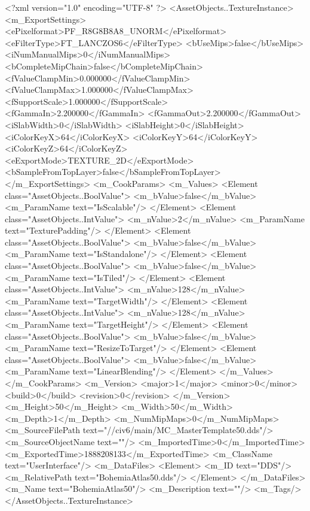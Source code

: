 <?xml version="1.0" encoding="UTF-8" ?>
<AssetObjects..TextureInstance>
	<m_ExportSettings>
		<ePixelformat>PF_R8G8B8A8_UNORM</ePixelformat>
		<eFilterType>FT_LANCZOS6</eFilterType>
		<bUseMips>false</bUseMips>
		<iNumManualMips>0</iNumManualMips>
		<bCompleteMipChain>false</bCompleteMipChain>
		<fValueClampMin>0.000000</fValueClampMin>
		<fValueClampMax>1.000000</fValueClampMax>
		<fSupportScale>1.000000</fSupportScale>
		<fGammaIn>2.200000</fGammaIn>
		<fGammaOut>2.200000</fGammaOut>
		<iSlabWidth>0</iSlabWidth>
		<iSlabHeight>0</iSlabHeight>
		<iColorKeyX>64</iColorKeyX>
		<iColorKeyY>64</iColorKeyY>
		<iColorKeyZ>64</iColorKeyZ>
		<eExportMode>TEXTURE_2D</eExportMode>
		<bSampleFromTopLayer>false</bSampleFromTopLayer>
	</m_ExportSettings>
	<m_CookParams>
		<m_Values>
			<Element class="AssetObjects..BoolValue">
				<m_bValue>false</m_bValue>
				<m_ParamName text="IsScalable"/>
			</Element>
			<Element class="AssetObjects..IntValue">
				<m_nValue>2</m_nValue>
				<m_ParamName text="TexturePadding"/>
			</Element>
			<Element class="AssetObjects..BoolValue">
				<m_bValue>false</m_bValue>
				<m_ParamName text="IsStandalone"/>
			</Element>
			<Element class="AssetObjects..BoolValue">
				<m_bValue>false</m_bValue>
				<m_ParamName text="IsTiled"/>
			</Element>
			<Element class="AssetObjects..IntValue">
				<m_nValue>128</m_nValue>
				<m_ParamName text="TargetWidth"/>
			</Element>
			<Element class="AssetObjects..IntValue">
				<m_nValue>128</m_nValue>
				<m_ParamName text="TargetHeight"/>
			</Element>
			<Element class="AssetObjects..BoolValue">
				<m_bValue>false</m_bValue>
				<m_ParamName text="ResizeToTarget"/>
			</Element>
			<Element class="AssetObjects..BoolValue">
				<m_bValue>false</m_bValue>
				<m_ParamName text="LinearBlending"/>
			</Element>
		</m_Values>
	</m_CookParams>
	<m_Version>
		<major>1</major>
		<minor>0</minor>
		<build>0</build>
		<revision>0</revision>
	</m_Version>
	<m_Height>50</m_Height>
	<m_Width>50</m_Width>
	<m_Depth>1</m_Depth>
	<m_NumMipMaps>0</m_NumMipMaps>
	<m_SourceFilePath text="//civ6/main/MC_MasterTemplate\Textures\BohemiaAtlas50.dds"/>
	<m_SourceObjectName text=""/>
	<m_ImportedTime>0</m_ImportedTime>
	<m_ExportedTime>1888208133</m_ExportedTime>
	<m_ClassName text="UserInterface"/>
	<m_DataFiles>
		<Element>
			<m_ID text="DDS"/>
			<m_RelativePath text="BohemiaAtlas50.dds"/>
		</Element>
	</m_DataFiles>
	<m_Name text="BohemiaAtlas50"/>
	<m_Description text=""/>
	<m_Tags/>
</AssetObjects..TextureInstance>

